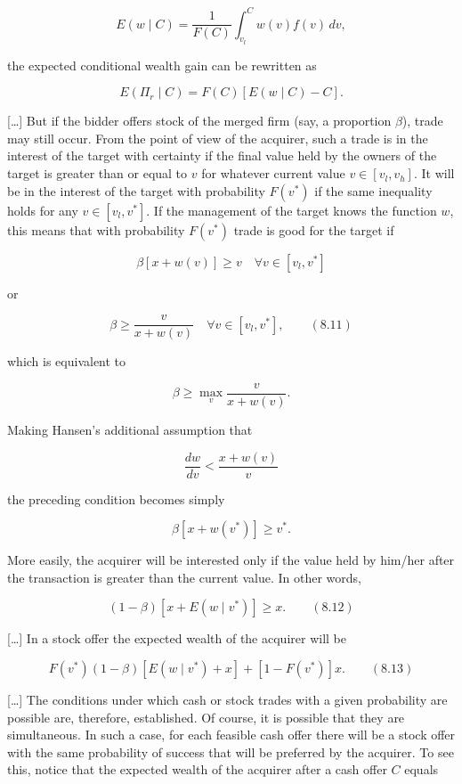 \documentclass[11pt,a4paper]{article}
\begin{document}
\[E(w \mid C) = \frac{1}{F(C)} \int_{v_l}^{C} w(v) f(v)\, dv,\]

the expected conditional wealth gain can be rewritten as

\[E(\Pi_r \mid C) = F(C)[E(w \mid C) - C].\]

{[}\ldots{]} But if the bidder offers stock of the merged firm (say, a proportion \(\beta\)), trade
may still occur. From the point of view of the acquirer, such a trade is in the interest of the
target with certainty if the final value held by the owners of the target is greater than or equal
to \(v\) for whatever current value \(v \in [v_l, v_h]\). It will be in the interest of the target
with probability \(F(v^*)\) if the same inequality holds for any \(v \in [v_l, v^*]\). If the
management of the target knows the function \(w\), this means that with probability \(F(v^*)\) trade
is good for the target if

\[\beta[x + w(v)] \geq v \quad \forall v \in [v_l, v^*]\]

or

\[\beta \geq \frac{v}{x + w(v)} \quad \forall v \in [v_l, v^*], \qquad (8.11)\]

which is equivalent to

\[\beta \geq \max_v \frac{v}{x + w(v)}.\]

Making Hansen's additional assumption that

\[\frac{dw}{dv} < \frac{x + w(v)}{v}\]

the preceding condition becomes simply

\[\beta[x + w(v^*)] \geq v^*.\]

More easily, the acquirer will be interested only if the value held by him/her after the transaction
is greater than the current value. In other words,

\[(1 - \beta)[x + E(w \mid v^*)] \geq x. \qquad (8.12)\]

{[}\ldots{]} In a stock offer the expected wealth of the acquirer will be

\[F(v^*)(1 - \beta)[E(w \mid v^*) + x] + [1 - F(v^*)]x. \qquad (8.13)\]

{[}\ldots{]} The conditions under which cash or stock trades with a given probability are possible
are, therefore, established. Of course, it is possible that they are simultaneous. In such a case,
for each feasible cash offer there will be a stock offer with the same probability of success that
will be preferred by the acquirer. To see this, notice that the expected wealth of the acquirer
after a cash offer \(C\) equals
\end{document}
